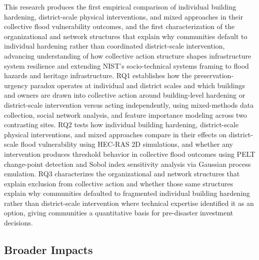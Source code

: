 \documentclass[11pt]{article}
\begin{document}
This research produces the first empirical comparison of individual building
hardening, district-scale physical interventions, and mixed approaches in
their collective flood vulnerability outcomes, and the first characterization
of the organizational and network structures that explain why communities
default to individual hardening rather than coordinated district-scale
intervention, advancing understanding of how collective action structure
shapes infrastructure system resilience and extending NIST's socio-technical
systems framing to flood hazards and heritage infrastructure. RQ1 establishes
how the preservation-urgency paradox operates at individual and district
scales and which buildings and owners are drawn into collective action around
building-level hardening or district-scale intervention versus acting independently, using mixed-methods data collection, social network
analysis, and feature importance modeling across two contrasting sites. RQ2 tests how individual building hardening,
district-scale physical interventions, and mixed approaches compare in their
effects on district-scale flood vulnerability using HEC-RAS 2D simulations, and whether any intervention produces threshold
behavior in collective flood outcomes using PELT change-point detection and Sobol index
sensitivity analysis via Gaussian process emulation. RQ3 characterizes the
organizational and network structures that explain exclusion from collective action
and whether those same structures explain why communities defaulted to fragmented
individual building hardening rather than district-scale intervention where technical
expertise identified it as an option, giving communities a quantitative basis for
pre-disaster investment decisions.

\vspace{-0.5cm}

\subsection{Broader Impacts}

\vspace{-0.3cm}
\end{document}
